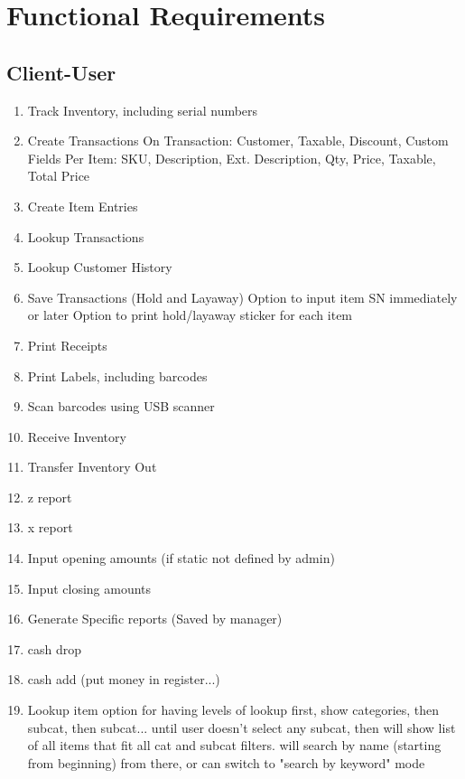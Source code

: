 \chapter{Functional Requirements}
\label{01_FuncReqs}

\section{Client-User}
\begin{enumerate}
	\item Track Inventory, including serial numbers
	\item Create Transactions
		\subitem On Transaction: Customer, Taxable, Discount, Custom Fields
		\subitem Per Item: SKU, Description, Ext. Description, Qty, Price, Taxable, Total Price
	\item Create Item Entries
	\item Lookup Transactions
	\item Lookup Customer History
	\item Save Transactions (Hold and Layaway)
		\subitem Option to input item SN immediately or later
		\subitem Option to print hold/layaway sticker for each item
	\item Print Receipts
	\item Print Labels, including barcodes
	\item Scan barcodes using USB scanner
	\item Receive Inventory
	\item Transfer Inventory Out
	\item z report
	\item x report
	\item Input opening amounts (if static not defined by admin)
	\item Input closing amounts
	\item Generate Specific reports (Saved by manager)
	\item cash drop
	\item cash add (put money in register...)
	\item Lookup item
		\subitem option for having levels of lookup
		\subitem first, show categories, then subcat, then subcat... until user doesn't select any subcat, then will show list of all items that fit all cat and subcat filters. will search by name (starting from beginning) from there, or can switch to "search by keyword" mode
\end{enumerate}

